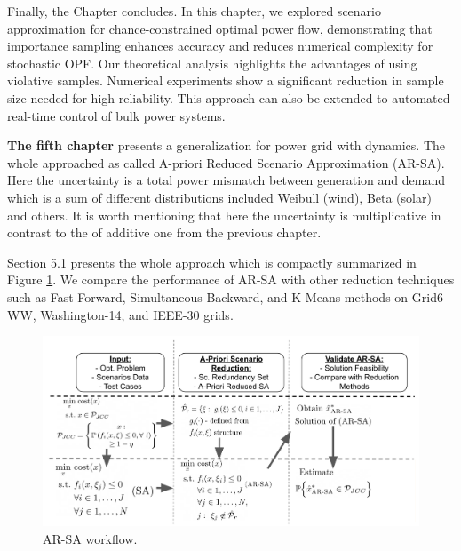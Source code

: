 Finally, the Chapter concludes. In this chapter, we explored scenario approximation for chance-constrained optimal power flow, demonstrating that importance sampling enhances accuracy and reduces numerical complexity for stochastic OPF.
Our theoretical analysis highlights the advantages of using violative samples. Numerical experiments show a significant reduction in sample size needed for high reliability. This approach can also be extended to automated real-time control of bulk power systems.

\textbf{The fifth chapter} presents a generalization for power grid with dynamics. The whole approached as called A-priori Reduced Scenario Approximation (AR-SA). Here the uncertainty is a total power mismatch between generation and demand which is a sum of different distributions included Weibull (wind), Beta (solar) and others. It is worth mentioning that here the uncertainty is multiplicative in contrast to the of additive one from the previous chapter.

Section 5.1 presents the whole approach which is compactly summarized in Figure \ref{fig:workflow}. We compare the performance of AR-SA with other reduction techniques such as Fast Forward, Simultaneous Backward, and K-Means methods on Grid6-WW, Washington-14, and IEEE-30 grids.

\begin{figure}
    \centering
    \hspace{-2mm}\includegraphics[width=1.\textwidth]{Dissertation/images/dynamic//scheme.png}
    \caption{AR-SA workflow.}
    \label{fig:workflow}
    \vspace{-1mm}
\end{figure}


